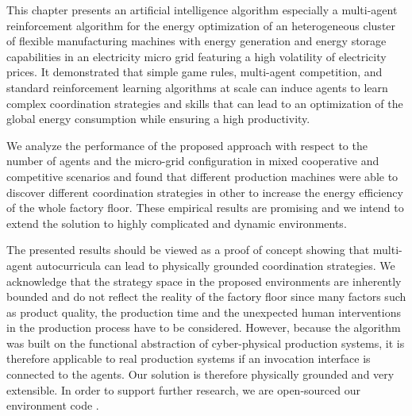 This chapter presents an artificial intelligence algorithm especially a multi-agent reinforcement algorithm for the energy optimization of an heterogeneous cluster of flexible manufacturing machines with energy generation and energy storage capabilities in an electricity micro grid featuring a high volatility of electricity prices. It demonstrated that simple game rules, multi-agent competition, and standard reinforcement learning algorithms at scale can induce agents to learn complex coordination strategies and skills that can lead to an optimization of the global energy consumption while ensuring a high productivity. 

We analyze the performance of the proposed approach with respect to the number of agents and the micro-grid configuration in mixed cooperative and competitive scenarios and found that different production machines were able to discover different coordination strategies in other to increase the energy efficiency of the whole factory floor. These empirical results are promising and we intend to extend the solution to highly complicated and dynamic environments.

The presented results should be viewed as a proof of concept showing that multi-agent autocurricula can lead to physically grounded coordination strategies. We acknowledge that the strategy space in the proposed environments are inherently bounded and do not reflect the reality of the factory floor since many factors such as product quality, the production time and the unexpected human interventions in the production process have to be considered. However, because the algorithm was built on the functional abstraction of cyber-physical production systems, it is therefore applicable to real production systems if an invocation interface is connected to the agents. Our solution is therefore physically grounded and very extensible. In order to support further research, we are open-sourced our environment code \cite{Bakakeu2019}.
